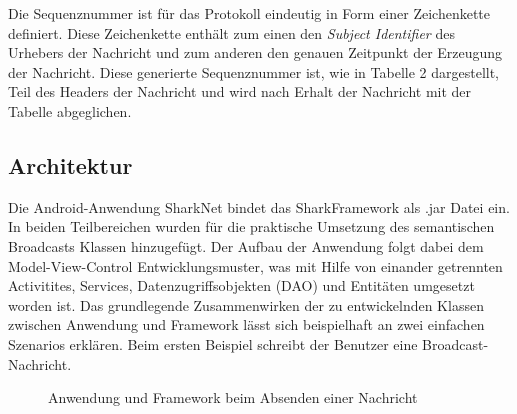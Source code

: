 Die Sequenznummer ist für das Protokoll eindeutig in Form einer Zeichenkette definiert. Diese Zeichenkette enthält zum einen den \textit{Subject Identifier} des Urhebers der Nachricht und zum anderen den genauen Zeitpunkt der Erzeugung der Nachricht. Diese generierte Sequenznummer ist, wie in Tabelle 2 dargestellt, Teil des Headers der Nachricht und wird nach Erhalt der Nachricht mit der Tabelle abgeglichen. 
\subsection{Architektur}
Die Android-Anwendung SharkNet bindet das SharkFramework als .jar Datei ein. In beiden Teilbereichen wurden für die praktische Umsetzung des semantischen Broadcasts Klassen hinzugefügt. Der Aufbau der Anwendung folgt dabei dem Model-View-Control Entwicklungsmuster, was mit Hilfe von einander getrennten Activitites, Services, Datenzugriffsobjekten (DAO) und Entitäten umgesetzt worden ist. Das grundlegende Zusammenwirken der zu entwickelnden Klassen zwischen Anwendung und Framework lässt sich beispielhaft an zwei einfachen Szenarios erklären. Beim ersten Beispiel schreibt der Benutzer eine Broadcast-Nachricht.
\begin{figure}[H]
	\centering
	\hspace*{1cm}
	\caption{Anwendung und Framework beim Absenden einer Nachricht}
	\label{fig:sendenNachrichtStruktur}
\end{figure}
